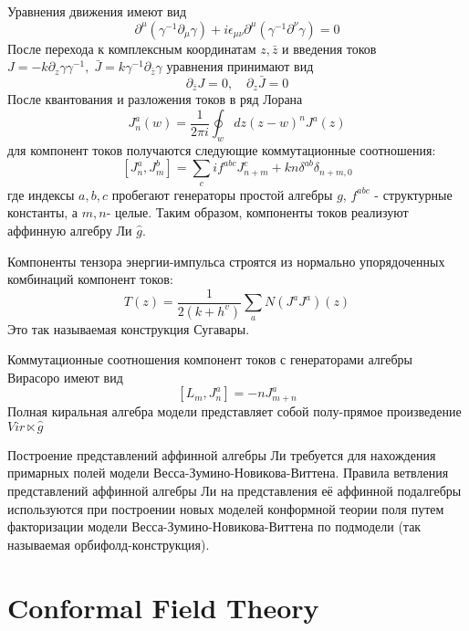 \documentclass[a4paper,12pt]{article}
\theoremstyle{definition} \newtheorem{Def}{Definition}
\begin{document}
Уравнения движения имеют вид
\begin{equation}
  \label{eq:3}
  \partial^{\mu}(\gamma^{-1}\partial_{\mu}\gamma)+i\epsilon_{\mu\nu}\partial^{\mu}(\gamma^{-1}\partial^{\nu}\gamma)=0
\end{equation}
После перехода к комплексным координатам $z,\bar z$ и введения токов $J=-k\partial_z\gamma\gamma^{-1},\; \bar J=k\gamma^{-1}\partial_{\bar z}\gamma$ уравнения принимают вид
\begin{equation}
  \label{eq:4}
  \partial_{\bar z}J=0,\quad \partial_z \bar J=0
\end{equation}
После квантования и разложения токов в ряд Лорана 
\begin{equation}
  \label{eq:8}
  J^a_n(w)=\frac{1}{2\pi i }\oint_{w}dz (z-w)^n J^a(z)  
\end{equation}
для компонент токов получаются следующие коммутационные соотношения:
\begin{equation}
  \label{eq:5}
  \left[J^a_n,J^b_m\right]=\sum_c i f^{abc}J^c_{n+m}+kn\delta^{ab}\delta_{n+m,0}
\end{equation}
где индексы $a,b,c$ пробегают генераторы простой алгебры $g$, $f^{abc}$ - структурные константы, а $m,n$-  целые.
Таким образом, компоненты токов реализуют аффинную алгебру Ли $\hat g$.

Компоненты тензора энергии-импульса строятся из нормально упорядоченных комбинаций компонент токов:
\begin{equation}
  \label{eq:6}
  T(z)=\frac{1}{2(k+h^v)}\sum_a N(J^a J^a)(z)
\end{equation}
Это так называемая конструкция Сугавары. 

Коммутационные соотношения компонент токов с генераторами алгебры Вирасоро имеют вид
\begin{equation}
  \label{eq:7}
  \left[L_m,J^a_n\right]=-nJ^a_{m+n}
\end{equation}
Полная киральная алгебра модели представляет собой полу-прямое произведение $Vir\ltimes \hat g$

Построение представлений аффинной алгебры Ли требуется для нахождения примарных полей модели Весса-Зумино-Новикова-Виттена. Правила ветвления представлений аффинной алгебры Ли на представления её аффинной подалгебры используются при построении новых моделей конформной теории поля путем факторизации модели Весса-Зумино-Новикова-Виттена по подмодели (так называемая орбифолд-конструкция). 



\section{Conformal Field Theory}
\label{sec:conf-field-theory}
\end{document}

